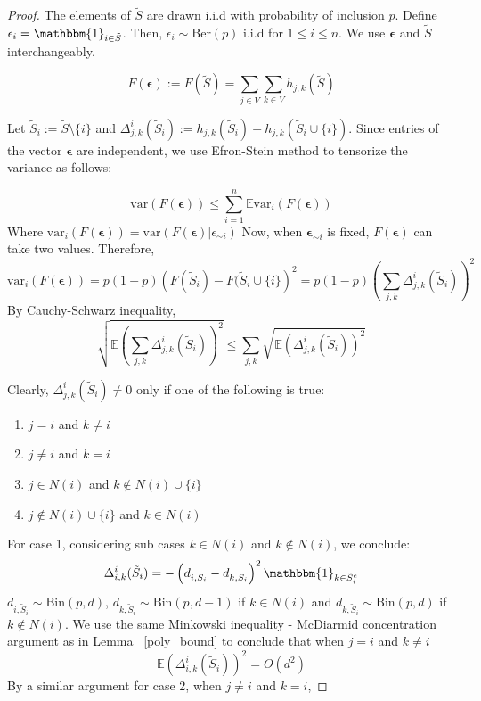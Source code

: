 \documentclass[final,12pt]{colt2018}
\begin{document}
\begin{proof}
The elements of $\tilde{S}$ are drawn i.i.d with probability of inclusion $p$. Define $\epsilon_i = \mathbbm{1}_{i \in \tilde{S}}$. Then, $\epsilon_i \sim \mathrm{Ber}(p)$ i.i.d for $1 \leq i \leq n$. We use $\bm{\epsilon}$ and $\tilde{S}$ interchangeably.

$$F(\bm{\epsilon}) := F(\tilde{S}) = \sum_{j\in V}\sum_{k \in V} h_{j,k}(\tilde{S}) $$

Let $\tilde{S}_i := \tilde{S} \setminus\{i\}$ and $\Delta^{i}_{j,k}\left(\tilde{S}_i\right) := h_{j,k}\left(\tilde{S}_i\right) - h_{j,k}\left(\tilde{S}_i \cup \{i\}\right)$. Since entries of the vector $\bm{\epsilon}$ are independent, we use Efron-Stein method to tensorize the variance as follows:

$$\mathrm{var}(F(\bm{\epsilon})) \leq \sum_{i=1}^{n} \mathbb{E}\mathrm{var}_i \left(F(\bm{\epsilon})\right)$$
Where $\mathrm{var}_i \left(F(\bm{\epsilon})\right) = \mathrm{var} \left(F(\bm{\epsilon})|\epsilon_{\sim i}\right)$
Now, when $\bm{\epsilon}_{\sim i}$ is fixed, $F(\bm{\epsilon})$ can take two values. Therefore, 
\begin{equation}
\mathrm{var}_i(F(\bm{\epsilon})) = p(1-p)\left(F(\tilde{S}_i) - F(\tilde{S}_i \cup \{i\}\right)^2 = p(1-p)\left(\sum_{j,k}\Delta^{i}_{j,k}(\tilde{S}_i)\right)^2
\label{tensor_var_delta}
\end{equation}
By Cauchy-Schwarz inequality,
\begin{equation}
\sqrt{\mathbb{E}\left(\sum_{j,k}\Delta^{i}_{j,k}(\tilde{S}_i)\right)^2} \leq \sum_{j,k} \sqrt{\mathbb{E}\left(\Delta^{i}_{j,k}(\tilde{S}_i)\right)^2}
\label{triangle_delta}
\end{equation}

Clearly, $\Delta^{i}_{j,k}(\tilde{S}_i) \neq 0$ only if one of the following is true:
\begin{enumerate}
\item
$j=i$ and $k \neq i$
\item
$j \neq i$ and $k = i$
\item
$j \in N(i)$ and $k \not \in N(i)\cup \{i\}$
\item
$j \not \in N(i)\cup \{i\}$ and  $k \in N(i)$
\end{enumerate}
For case 1, considering sub cases $k \in N(i)$ and $k \not \in N(i)$, we conclude:
$$\Delta_{i,k}^{i}(\tilde{S}_i) = - \left(d_{i,\tilde{S}_i} -d_{k,\tilde{S}_i}\right)^2\mathbbm{1}_{k\in \tilde{S}_i^c}$$
$d_{i,\tilde{S}_i} \sim \mathrm{Bin}(p,d)$, $d_{k,\tilde{S}_i} \sim \mathrm{Bin}(p,d-1)$ if $k \in N(i)$ and $d_{k,\tilde{S}_i} \sim \mathrm{Bin}(p,d)$ if $k \not \in N(i)$. We use the same Minkowski inequality - McDiarmid concentration argument as in Lemma ~\ref{poly_bound} to conclude that when $j =i$ and $k \neq i$
\begin{equation}
\mathbb{E}\left(\Delta^{i}_{i,k}(\tilde{S}_i)\right)^2 = O(d^2) 
\label{case_1_tensor_bound}
\end{equation}
By a similar argument for case 2, when $j \neq i$ and $k =i$,


\end{proof}
\end{document}
